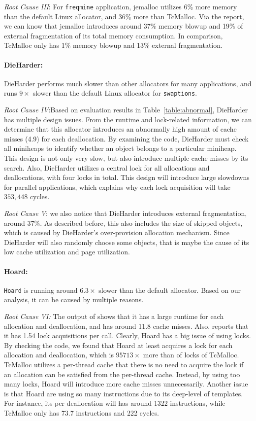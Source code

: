 \textit{Root Cause \RN{3}}: For \texttt{freqmine} application, jemalloc utilizes 6\% more memory than the default Linux allocator, and 36\% more than TcMalloc. Via the report, we can know that jemalloc introduces around 37\% memory blowup and 19\% of external fragmentation of its total memory consumption. In comparison, TcMalloc only has 1\% memory blowup and 13\% external fragmentation.  

\paragraph{DieHarder:} DieHarder performs much slower than other allocators for many applications, and runs $9\times$ slower than the default Linux allocator for \texttt{swaptions}.

\textit{Root Cause \RN{4}}:Based on evaluation results in Table~\ref{table:abnormal}, DieHarder has multiple design issues. From the runtime and lock-related information, we can determine that this allocator introduces an abnormally high amount of cache misses (4.9) for each deallocation. By examining the code, DieHarder must check all miniheaps to identify whether an object belongs to a particular miniheap. This design is not only very slow, but also introduce multiple cache misses by its search. Also, DieHarder utilizes a central lock for all allocations and deallocations, with four locks in total. This design will introduce large slowdowns for parallel applications, which explains why each lock acquisition will take $353,448$ cycles. 

\textit{Root Cause \RN{5}}: we also notice that DieHarder introduces external fragmentation, around 37\%. As described before, this also includes the size of skipped objects, which is caused by DieHarder's over-provision allocation mechanism. Since DieHarder will also randomly choose some objects, that is maybe the cause of its low cache utilization and page utilization. 


\paragraph{Hoard:} 
 \texttt{Hoard} is running around $6.3\times$ slower than the default allocator. Based on our analysis, it can be caused by multiple reasons.
 
 \textit{Root Cause \RN{6}:}
 The output of \MP{} shows that it has a large runtime for each allocation and deallocation, and has around 11.8 cache misses. Also, \MP{} reports that it has 1.54 lock acquisitions per call. Clearly, Hoard has a big issue of using locks. By checking the code, we found that Hoard at least acquires a lock for each allocation and deallocation, which is $95713\times$ more than of locks of TcMalloc. TcMalloc utilizes a per-thread cache that there is no need to acquire the lock if an allocation can be satisfied from the per-thread cache. Instead, by using too many locks, Hoard will introduce more cache misses unnecessarily. Another issue is that Hoard are using so many instructions due to its deep-level of templates. For instance, its per-deallocation will has around 1322 instructions, while TcMalloc only has 73.7 instructions and 222 cycles.  
 
